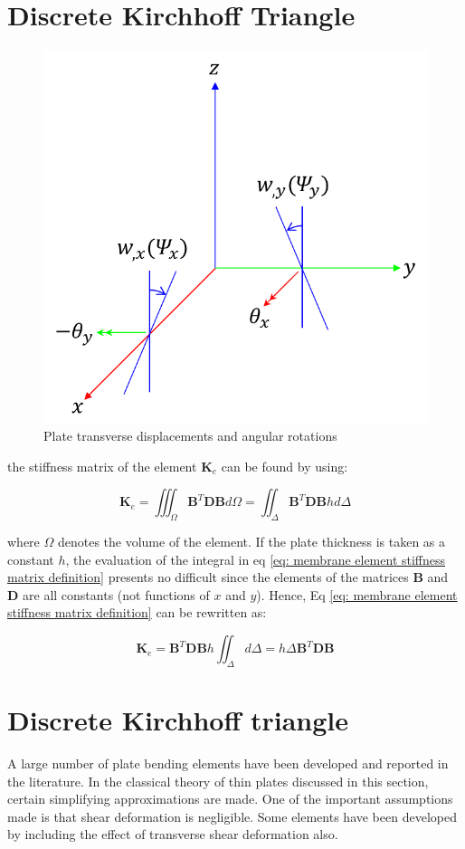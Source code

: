 
\section{Discrete Kirchhoff Triangle}

\begin{figure}[h!]
\centering
\includegraphics[width=0.5\linewidth]{figures/DKT_angular_displacement}
\caption{Plate transverse displacements and angular rotations}
\label{fig:DKT_angular_displacement}
\end{figure}

the stiffness matrix of the element $ \mathbf{K}_e $ can be found by using:

\begin{equation}\label{eq: membrane element stiffness matrix definition}
\mathbf{K}_e=\iiint_\Omega \mathbf{B}^T \mathbf{DB} d\Omega = \iint_\Delta \mathbf{B}^T \mathbf{DB} h d\Delta
\end{equation}

where $ \Omega $ denotes the volume of the element. If the plate thickness is taken as a constant $ h $, the evaluation of the integral in eq \ref{eq: membrane element stiffness matrix definition} presents no difficult since the elements of the matrices $ \mathbf{B} $ and $ \mathbf{D} $ are all constants (not functions of $ x $ and $ y $). Hence, Eq \ref{eq: membrane element stiffness matrix definition} can be rewritten as:

\begin{equation}\label{eq: memrane element stiffness matrix}
\mathbf{K}_e = \mathbf{B}^T \mathbf{DB} h \iint_\Delta   d\Delta =  h\Delta \mathbf{B}^T \mathbf{DB}
\end{equation}

\section{Discrete Kirchhoff triangle}
A large number of plate bending elements have been developed and reported in the literature. In the classical theory of thin plates discussed in this section, certain simplifying approximations are made. One of the important assumptions made is that shear deformation is negligible. Some elements have been developed by including the effect of transverse shear deformation also.

